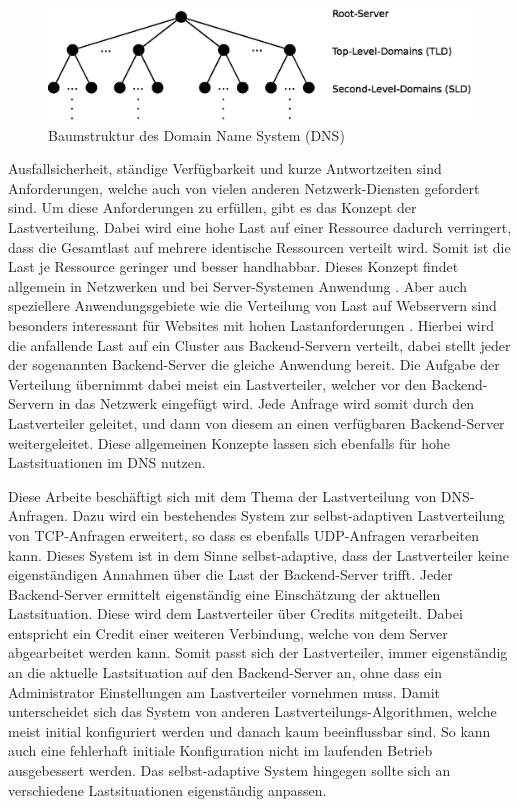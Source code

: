 \documentclass[a4paper, 12pt, BCOR10mm, DIV12, toc=bibliography, toc=listof, german]{scrbook}
\def \dns {Domain Name System (DNS)}
\begin{document}
		\begin{figure}
			\centering
			\includegraphics[width=\textwidth]{images/tree}
			\caption{Baumstruktur des \dns{}}
			\label{fig:tree}
		\end{figure}

		Ausfallsicherheit, ständige Verfügbarkeit und kurze Antwortzeiten sind Anforderungen, welche
		auch von vielen anderen Netzwerk-Diensten gefordert sind. Um diese Anforderungen zu erfüllen,
		gibt es das Konzept der Lastverteilung. Dabei wird eine hohe Last auf einer Ressource dadurch
		verringert, dass die Gesamtlast auf mehrere identische Ressourcen verteilt wird. Somit ist die
		Last je Ressource geringer und besser handhabbar. Dieses Konzept findet allgemein in Netzwerken
		und bei Server-Systemen Anwendung \cite{bourke2001, kopparapu2002}. Aber auch speziellere
		Anwendungsgebiete wie die Verteilung von Last auf Webservern sind besonders interessant für
		Websites mit hohen Lastanforderungen \cite{meplho2012}. Hierbei wird die anfallende Last auf ein
		Cluster aus Backend-Servern verteilt, dabei stellt jeder der sogenannten Backend-Server die
		gleiche Anwendung bereit. Die Aufgabe der Verteilung übernimmt dabei meist ein Lastverteiler,
		welcher vor den Backend-Servern in das Netzwerk eingefügt wird. Jede Anfrage wird somit durch
		den Lastverteiler geleitet, und dann von diesem an einen verfügbaren Backend-Server
		weitergeleitet. Diese allgemeinen Konzepte lassen sich ebenfalls für hohe Lastsituationen im DNS
		nutzen.

		Diese Arbeite beschäftigt sich mit dem Thema der Lastverteilung von DNS-Anfragen. Dazu wird ein
		bestehendes System \cite{zinke2007,scsczile2008,zinke2012,salbnet} zur selbst-adaptiven
		Lastverteilung von TCP-Anfragen erweitert, so dass es ebenfalls UDP-Anfragen verarbeiten kann.
		Dieses System ist in dem Sinne selbst-adaptive, dass der Lastverteiler keine eigenständigen
		Annahmen über die Last der Backend-Server trifft. Jeder Backend-Server ermittelt eigenständig
		eine Einschätzung der aktuellen Lastsituation. Diese wird dem Lastverteiler über Credits
		mitgeteilt. Dabei entspricht ein Credit einer weiteren Verbindung, welche von dem Server
		abgearbeitet werden kann. Somit passt sich der Lastverteiler, immer eigenständig an die aktuelle
		Lastsituation auf den Backend-Server an, ohne dass ein Administrator Einstellungen am
		Lastverteiler vornehmen muss.  Damit unterscheidet sich das System von anderen
		Lastverteilungs-Algorithmen, welche meist initial konfiguriert werden und danach kaum
		beeinflussbar sind. So kann auch eine fehlerhaft initiale Konfiguration nicht im laufenden
		Betrieb ausgebessert werden. Das selbst-adaptive System hingegen sollte sich an verschiedene
		Lastsituationen eigenständig anpassen.
\end{document}
